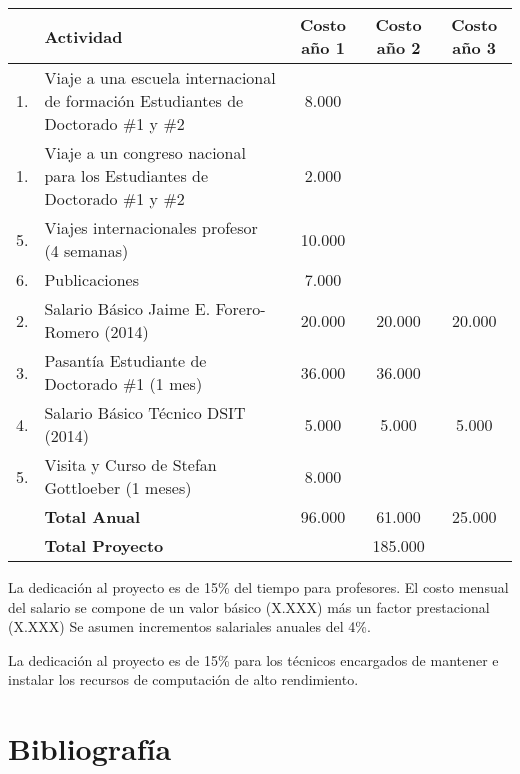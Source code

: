 \documentclass[12pt]{article}
\begin{document}
\begin{tabular}{|l |p{4.5cm}| c |c |c|}\hline
& Actividad & Costo a\~no 1 & Costo a\~no 2 & Costo a\~no 3\\\hline
1. & Viaje a una escuela internacional de formaci\'on Estudiantes de
Doctorado \#1 y \#2 & 8.000 & & \\\hline
1. & Viaje a un congreso nacional para los Estudiantes de
Doctorado \#1 y \#2 & 2.000 & & \\\hline
5. & Viajes internacionales profesor (4 semanas) & 10.000 & & \\ \hline
6. & Publicaciones &  7.000 & & \\\hline 
2. & Salario B\'asico Jaime E. Forero-Romero (2014) & 20.000 & 20.000
& 20.000 \\\hline  

3. & Pasant\'ia Estudiante de Doctorado \#1 (1 mes) & 36.000 &
36.000 & \\\hline

4. & Salario B\'asico T\'ecnico DSIT (2014) & 5.000 & 5.000
& 5.000 \\\hline  

5. & Visita y Curso de Stefan Gottloeber (1 meses) & 8.000 & & \\\hline

& {\bf Total Anual} & 96.000 & 61.000 & 25.000\\\hline
& {{\bf Total Proyecto}} & \multicolumn{3}{|c|}{185.000}\\\hline

\end{tabular} 

La dedicaci\'on al proyecto es de 15\% del tiempo para
profesores. El costo mensual del salario se compone de un valor
b\'asico (X.XXX) m\'as un factor prestacional (X.XXX) Se asumen
incrementos salariales anuales del 4\%. 

La dedicaci\'on al proyecto es de 15\% para los t\'ecnicos encargados
de mantener e instalar los recursos de computaci\'on de alto
rendimiento. 


\section{Bibliograf\'ia}

{}

\end{document}
